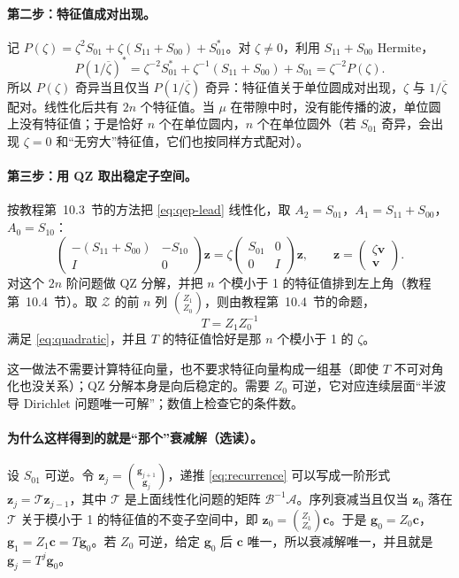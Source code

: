 \documentclass[11pt,a4paper,fontset=fandol]{ctexart}
\begin{document}
\paragraph{第二步：特征值成对出现。} 记 $P(\zeta)=\zeta^2S_{01}+\zeta(S_{11}+S_{00})+S_{01}^*$。对 $\zeta\ne0$，利用 $S_{11}+S_{00}$ Hermite，
\[
P(1/\overline\zeta)^*=\zeta^{-2}S_{01}^*+\zeta^{-1}(S_{11}+S_{00})+S_{01}=\zeta^{-2}P(\zeta) .
\]
所以 $P(\zeta)$ 奇异当且仅当 $P(1/\overline\zeta)$ 奇异：特征值关于单位圆成对出现，$\zeta$ 与 $1/\overline\zeta$ 配对。线性化后共有 $2n$ 个特征值。当 $\mu$ 在带隙中时，没有能传播的波，单位圆上没有特征值；于是恰好 $n$ 个在单位圆内，$n$ 个在单位圆外（若 $S_{01}$ 奇异，会出现 $\zeta=0$ 和“无穷大”特征值，它们也按同样方式配对）。

\paragraph{第三步：用 QZ 取出稳定子空间。} 按教程第~10.3~节的方法把 \eqref{eq:qep-lead} 线性化，取 $A_2=S_{01}$，$A_1=S_{11}+S_{00}$，$A_0=S_{10}$：
\[
\begin{pmatrix}-(S_{11}+S_{00})&-S_{10}\\ I&0\end{pmatrix}\bm z=\zeta\begin{pmatrix}S_{01}&0\\0&I\end{pmatrix}\bm z,\qquad \bm z=\begin{pmatrix}\zeta\bm v\\ \bm v\end{pmatrix}.
\]
对这个 $2n$ 阶问题做 QZ 分解，并把 $n$ 个模小于 1 的特征值排到左上角（教程第~10.4~节）。取 $\mathcal Z$ 的前 $n$ 列 $\binom{Z_1}{Z_0}$，则由教程第~10.4~节的命题，
\begin{equation}
\label{eq:T}
T=Z_1Z_0^{-1}
\end{equation}
满足 \eqref{eq:quadratic}，并且 $T$ 的特征值恰好是那 $n$ 个模小于 1 的 $\zeta$。

这一做法不需要计算特征向量，也不要求特征向量构成一组基（即使 $T$ 不可对角化也没关系）；QZ 分解本身是向后稳定的。需要 $Z_0$ 可逆，它对应连续层面“半波导 Dirichlet 问题唯一可解”；数值上检查它的条件数。

\paragraph{为什么这样得到的就是“那个”衰减解（选读）。} 设 $S_{01}$ 可逆。令 $\bm z_j=\binom{\bm g_{j+1}}{\bm g_j}$，递推 \eqref{eq:recurrence} 可以写成一阶形式 $\bm z_j=\mathcal T\bm z_{j-1}$，其中 $\mathcal T$ 是上面线性化问题的矩阵 $\mathcal B^{-1}\mathcal A$。序列衰减当且仅当 $\bm z_0$ 落在 $\mathcal T$ 关于模小于 1 的特征值的不变子空间中，即 $\bm z_0=\binom{Z_1}{Z_0}\bm c$。于是 $\bm g_0=Z_0\bm c$，$\bm g_1=Z_1\bm c=T\bm g_0$。若 $Z_0$ 可逆，给定 $\bm g_0$ 后 $\bm c$ 唯一，所以衰减解唯一，并且就是 $\bm g_j=T^j\bm g_0$。
\end{document}
